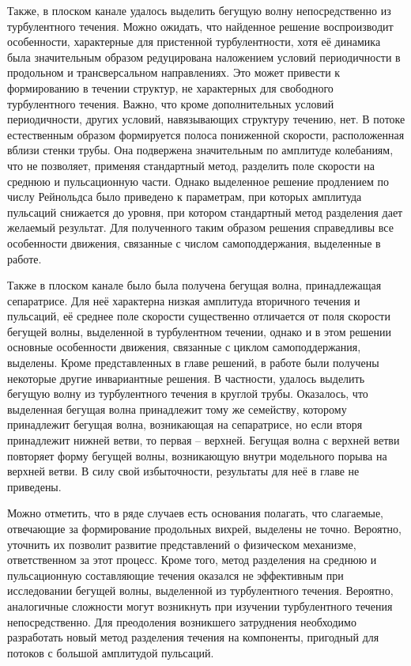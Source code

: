Также, в плоском канале удалось выделить бегущую волну непосредственно из турбулентного течения. Можно ожидать, что найденное решение воспроизводит особенности, характерные для пристенной турбулентности, хотя её динамика была значительным образом редуцирована наложением условий периодичности в продольном и трансверсальном направлениях. Это может привести к формированию в течении структур, не характерных для свободного турбулентного течения. Важно, что кроме дополнительных условий периодичности, других условий, навязывающих структуру течению, нет. В потоке естественным образом формируется полоса пониженной скорости, расположенная вблизи стенки трубы. Она подвержена значительным по амплитуде колебаниям, что не позволяет, применяя стандартный метод, разделить поле скорости на среднюю и пульсационную части. Однако выделенное решение продлением по числу Рейнольдса было приведено к параметрам, при которых амплитуда пульсаций снижается до уровня, при котором стандартный метод разделения дает желаемый результат. Для полученного таким образом решения справедливы все особенности движения, связанные с числом самоподдержания, выделенные в работе.

Также в плоском канале было была получена бегущая волна, принадлежащая сепаратрисе. Для неё характерна низкая амплитуда вторичного течения и пульсаций, её среднее поле скорости существенно отличается от поля скорости бегущей волны, выделенной в турбулентном течении, однако и в этом решении основные особенности движения, связанные с циклом самоподдержания, выделены. Кроме представленных в главе решений, в работе были получены некоторые другие инвариантные решения. В частности, удалось выделить бегущую волну из турбулентного течения в круглой трубы. Оказалось, что выделенная бегущая волна принадлежит тому же семейству, которому принадлежит бегущая волна, возникающая на сепаратрисе, но если вторя принадлежит нижней ветви, то первая -- верхней. Бегущая волна с верхней ветви повторяет форму бегущей волны, возникающую внутри модельного порыва на верхней ветви. В силу свой избыточности, результаты для неё в главе не приведены. 

Можно отметить, что в ряде случаев есть основания полагать, что слагаемые, отвечающие за формирование продольных вихрей, выделены не точно. Вероятно, уточнить их позволит развитие представлений о физическом механизме, ответственном за этот процесс. Кроме того, метод разделения на среднюю и пульсационную составляющие течения оказался не эффективным при исследовании бегущей волны, выделенной из турбулентного течения. Вероятно, аналогичные сложности могут возникнуть при изучении турбулентного течения непосредственно. Для преодоления возникшего затруднения необходимо разработать новый метод разделения течения на компоненты, пригодный для потоков с большой амплитудой пульсаций.

